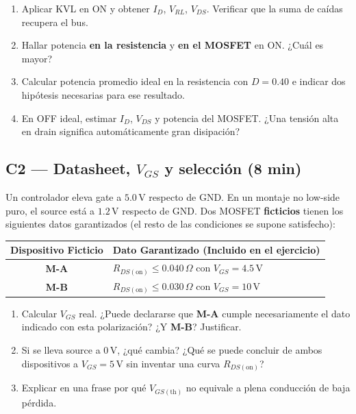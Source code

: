 \documentclass[11pt, a4paper]{article}
\begin{document}
\begin{enumerate}[label=\arabic*., noitemsep]
    \item Aplicar KVL en ON y obtener $I_D$, $V_{RL}$, $V_{DS}$. Verificar que la suma de caídas recupera el bus.
    \item Hallar potencia \textbf{en la resistencia} y \textbf{en el MOSFET} en ON. ¿Cuál es mayor? 
    \item Calcular potencia promedio ideal en la resistencia con $D=0.40$ e indicar dos hipótesis necesarias para ese resultado.
    \item En OFF ideal, estimar $I_D$, $V_{DS}$ y potencia del MOSFET. ¿Una tensión alta en drain significa automáticamente gran disipación?
\end{enumerate}

\subsection*{C2 — Datasheet, $V_{GS}$ y selección (8 min)}
Un controlador eleva gate a $5.0\,\text{V}$ respecto de GND. En un montaje no low-side puro, el source está a $1.2\,\text{V}$ respecto de GND. Dos MOSFET \textbf{ficticios} tienen los siguientes datos garantizados (el resto de las condiciones se supone satisfecho):

\begin{center}
\renewcommand{\arraystretch}{1.2}
\begin{tabularx}{0.85\linewidth}{|c|X|}
\hline
\rowcolor{ucbgray} \textbf{Dispositivo Ficticio} & \textbf{Dato Garantizado (Incluido en el ejercicio)} \\ \hline
\textbf{M-A} & $R_{DS(\text{on})} \le 0.040\,\Omega$ con $V_{GS} = 4.5\,\text{V}$ \\ \hline
\textbf{M-B} & $R_{DS(\text{on})} \le 0.030\,\Omega$ con $V_{GS} = 10\,\text{V}$ \\ \hline
\end{tabularx}
\end{center}

\begin{enumerate}[label=\arabic*., noitemsep]
    \item Calcular $V_{GS}$ real. ¿Puede declararse que \textbf{M-A} cumple necesariamente el dato indicado con esta polarización? ¿Y \textbf{M-B}? Justificar.
    \item Si se lleva source a $0\,\text{V}$, ¿qué cambia? ¿Qué se puede concluir de ambos dispositivos a $V_{GS}=5\,\text{V}$ sin inventar una curva $R_{DS(\text{on})}$?
    \item Explicar en una frase por qué $V_{GS(\text{th})}$ no equivale a plena conducción de baja pérdida.
\end{enumerate}
\end{document}

